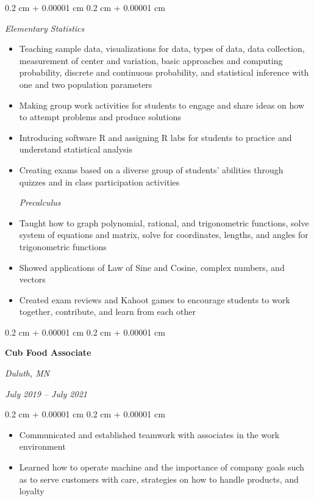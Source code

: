 \documentclass[10pt, letterpaper]{article}
\newenvironment{highlights}{
    \begin{itemize}[
        topsep=0.10 cm,
        parsep=0.10 cm,
        partopsep=0pt,
        itemsep=0pt,
        leftmargin=0.4 cm + 10pt
    ]
}{
    \end{itemize}
} %
\newenvironment{onecolentry}{
    \begin{adjustwidth}{
        0.2 cm + 0.00001 cm
    }{
        0.2 cm + 0.00001 cm
    }
}{
    \end{adjustwidth}
} %
\newenvironment{twocolentry}[2][]{
    \onecolentry
    \def\secondColumn{#2}
    \setcolumnwidth{\fill, 4.5 cm}
    \begin{paracol}{2}
}{
    \switchcolumn \raggedleft \secondColumn
    \end{paracol}
    \endonecolentry
} %
\begin{document}
        \vspace{0.10 cm}
        \begin{onecolentry}
        \textit{Elementary Statistics}
            \begin{highlights}
                \item Teaching sample data, visualizations for data, types of data, data collection, measurement of center and variation, basic approaches and computing probability, discrete and continuous probability, and statistical inference with one and two population parameters
                \item Making group work activities for students to engage and share ideas on how to attempt problems and produce solutions
                \item Introducing software R and assigning R labs for students to practice and understand statistical analysis
                \item Creating exams based on a diverse group of students’ abilities through quizzes and in class participation activities

\textit{Precalculus}
                \item Taught how to graph polynomial, rational, and trigonometric functions, solve system of equations and matrix, solve for coordinates, lengths, and angles for trigonometric functions
                \item Showed applications of Law of Sine and Cosine, complex numbers, and vectors
                \item Created exam reviews and Kahoot games to encourage students to work together, contribute, and learn from each other

                
            \end{highlights}
        \end{onecolentry}


        \vspace{0.2 cm}

        \begin{twocolentry}{
        \textit{Duluth, MN}    
            
        \textit{July 2019 – July 2021}}
            \textbf{Cub Food Associate}
            
        \end{twocolentry}

        \vspace{0.10 cm}
        \begin{onecolentry}
            \begin{highlights}
                \item Communicated and established teamwork with associates in the work environment
                \item Learned how to operate machine and the importance of company goals such as to serve customers with care, strategies on how to handle products, and loyalty  
            \end{highlights}
        \end{onecolentry}
\end{document}

